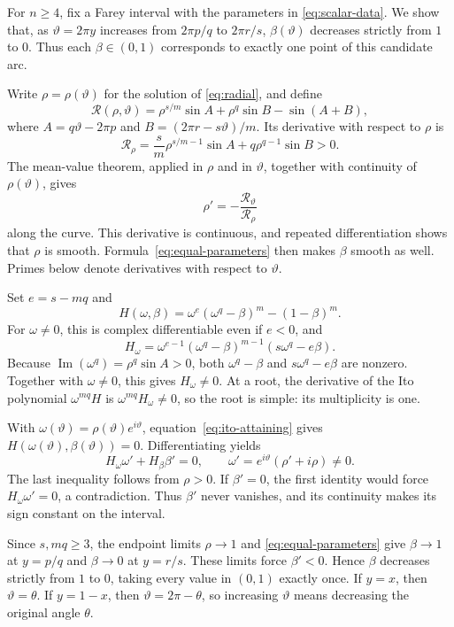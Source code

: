 \documentclass[11pt,a4paper]{article}
\theoremstyle{definition}
\theoremstyle{remark}
\numberwithin{equation}{section}
\begin{document}
For $n\ge4$, fix a Farey interval with the parameters in \eqref{eq:scalar-data}. We show that, as $\vartheta=2\pi y$ increases from $2\pi p/q$ to $2\pi r/s$, $\beta(\vartheta)$ decreases strictly from $1$ to $0$. Thus each $\beta\in(0,1)$ corresponds to exactly one point of this candidate arc.

Write $\rho=\rho(\vartheta)$ for the solution of \eqref{eq:radial}, and define
\[
 \mathcal R(\rho,\vartheta)
 =\rho^{s/m}\sin A+\rho^q\sin B-\sin(A+B),
\]
where $A=q\vartheta-2\pi p$ and $B=(2\pi r-s\vartheta)/m$. Its derivative with respect to $\rho$ is
\[
 \mathcal R_\rho
 =\frac{s}{m}\rho^{s/m-1}\sin A+q\rho^{q-1}\sin B>0.
\]
The mean-value theorem, applied in $\rho$ and in $\vartheta$, together with continuity of $\rho(\vartheta)$, gives
\[
 \rho'=-\frac{\mathcal R_\vartheta}{\mathcal R_\rho}
\]
along the curve. This derivative is continuous, and repeated differentiation shows that $\rho$ is smooth. Formula~\eqref{eq:equal-parameters} then makes $\beta$ smooth as well. Primes below denote derivatives with respect to $\vartheta$.

Set $e=s-mq$ and
\[
 H(\omega,\beta)=\omega^e(\omega^q-\beta)^m-(1-\beta)^m.
\]
For $\omega\ne0$, this is complex differentiable even if $e<0$, and
\[
 H_\omega
 =\omega^{e-1}(\omega^q-\beta)^{m-1}
       (s\omega^q-e\beta).
\]
Because $\operatorname{Im}(\omega^q)=\rho^q\sin A>0$, both $\omega^q-\beta$ and $s\omega^q-e\beta$ are nonzero. Together with $\omega\ne0$, this gives $H_\omega\ne0$. At a root, the derivative of the Ito polynomial $\omega^{mq}H$ is $\omega^{mq}H_\omega\ne0$, so the root is simple: its multiplicity is one.

With $\omega(\vartheta)=\rho(\vartheta)e^{i\vartheta}$, equation~\eqref{eq:ito-attaining} gives $H(\omega(\vartheta),\beta(\vartheta))=0$. Differentiating yields
\[
 H_\omega\omega'+H_\beta\beta'=0,\qquad
 \omega'=e^{i\vartheta}(\rho'+i\rho)\ne0.
\]
The last inequality follows from $\rho>0$. If $\beta'=0$, the first identity would force $H_\omega\omega'=0$, a contradiction. Thus $\beta'$ never vanishes, and its continuity makes its sign constant on the interval.

Since $s,mq\ge3$, the endpoint limits $\rho\to1$ and \eqref{eq:equal-parameters} give $\beta\to1$ at $y=p/q$ and $\beta\to0$ at $y=r/s$. These limits force $\beta'<0$. Hence $\beta$ decreases strictly from $1$ to $0$, taking every value in $(0,1)$ exactly once. If $y=x$, then $\vartheta=\theta$. If $y=1-x$, then $\vartheta=2\pi-\theta$, so increasing $\vartheta$ means decreasing the original angle $\theta$.
\end{document}
